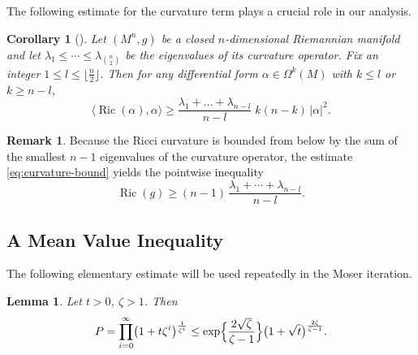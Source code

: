 \documentclass[12pt, twoside]{article}
\newtheorem{corollary}[theorem]{Corollary}
\newtheorem{lemma}[theorem]{Lemma}
\theoremstyle{definition}
\newtheorem{remark}[theorem]{Remark}
\numberwithin{equation}{section}
\begin{document}
The following estimate for the curvature term plays a crucial role in our analysis.

	
	\begin{corollary}[{\cite[Lemma 2.1]{Petersen2021}}]\label{cor:eigenvalue-estimate}
		Let \((M^{n},g)\) be a closed \(n\)-dimensional Riemannian manifold and let  
		\(\lambda_{1}\le\cdots\le\lambda_{\binom{n}{2}}\) be the eigenvalues of its curvature operator.  
		Fix an integer \(1\le l\le\big\lfloor\frac{n}{2}\big\rfloor\).  
		Then for any differential form \(\alpha\in\Omega^{k}(M)\) with \(k\le l\) or \(k\ge n-l\),
		\begin{equation}\label{eq:curvature-bound}
		\langle\operatorname{Ric}(\alpha),\alpha\rangle
		\ge \frac{\lambda_{1}+\dots+\lambda_{n-l}}{n-l}\;k(n-k)\,|\alpha|^{2}.
		\end{equation}
	\end{corollary}
	
	\begin{remark}\label{Rem}
		Because the Ricci curvature is bounded from below by the sum of the smallest \(n-1\) eigenvalues of the curvature operator, the estimate \eqref{eq:curvature-bound} yields the pointwise inequality
		\begin{equation}\label{rem}
		\operatorname{Ric}(g) \ge (n-1)\,\frac{\lambda_{1}+\cdots+\lambda_{n-l}}{n-l}. 
		\end{equation}
	\end{remark}
	
	\subsection{A Mean Value Inequality}
	The following elementary estimate will be used repeatedly in the Moser iteration.
	
	\begin{lemma}\label{lem:product-estimate}
		Let \(t > 0\), \(\zeta > 1\). Then
		\[
		P = \prod_{i=0}^{\infty} \bigl(1 + t\zeta^{i}\bigr)^{\frac{1}{\zeta^{i}}}
		\le \exp\Bigl\{\frac{2\sqrt{\zeta}}{\zeta-1}\Bigr\}
		\bigl(1+\sqrt{t}\bigr)^{\frac{2\zeta}{\zeta-1}} .
		\]
	\end{lemma}
	
\end{document}
